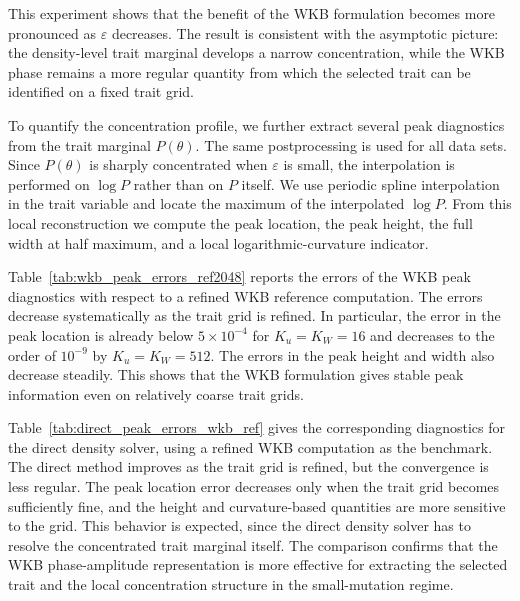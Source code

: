 \documentclass[11pt]{article}
\begin{document}
This experiment shows that the benefit of the WKB formulation becomes more
pronounced as \(\varepsilon\) decreases.  The result is consistent with the
asymptotic picture: the density-level trait marginal develops a narrow
concentration, while the WKB phase remains a more regular quantity from which
the selected trait can be identified on a fixed trait grid.





To quantify the concentration profile, we further extract several peak
diagnostics from the trait marginal \(P(\theta)\).  The same postprocessing is
used for all data sets.  Since \(P(\theta)\) is sharply concentrated when
\(\varepsilon\) is small, the interpolation is performed on \(\log P\) rather
than on \(P\) itself.  We use periodic spline interpolation in the trait variable and 
locate the maximum of the interpolated \(\log P\). 
 From this local reconstruction we compute
the peak location, the peak height, the full width at half maximum, and a local
logarithmic-curvature indicator.


Table~\ref{tab:wkb_peak_errors_ref2048} reports the errors of the WKB peak
diagnostics with respect to a refined WKB reference computation.  The errors
decrease systematically as the trait grid is refined.  In particular, the error
in the peak location is already below \(5\times10^{-4}\) for \(K_u=K_W=16\)
and decreases to the order of \(10^{-9}\) by \(K_u=K_W=512\).  The errors in
the peak height and width also decrease steadily.  This shows that the WKB
formulation gives stable peak information even on relatively coarse trait
grids.

Table~\ref{tab:direct_peak_errors_wkb_ref} gives the corresponding diagnostics
for the direct density solver, using a refined WKB computation as the
benchmark.  The direct method improves as the trait grid is refined, but the
convergence is less regular.  The peak location error decreases only when the
trait grid becomes sufficiently fine, and the height and curvature-based
quantities are more sensitive to the grid.  This behavior is expected, since
the direct density solver has to resolve the concentrated trait marginal
itself.  The comparison confirms that the WKB phase-amplitude representation is
more effective for extracting the selected trait and the local concentration
structure in the small-mutation regime.
\end{document}
